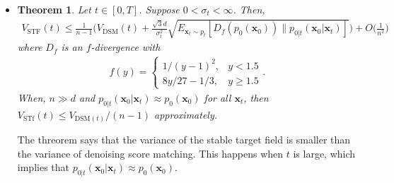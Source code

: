 \documentclass[10pt]{article}
\newtheorem{theorem}[lemma]{Theorem}
\newcommand{\ve}[1]{\mathbf{#1}}
\newcommand{\mrm}[1]{\mathrm{#1}}
\begin{document}
\begin{itemize}
  \item \begin{theorem}
    Let $t \in [0, T]$. Suppose $0 < \sigma_t < \infty$. Then,
    \begin{align*}
      V_{\mrm{STF}}(t) \leq \frac{1}{n-1} \bigg( V_{\mrm{DSM}}(t) + \frac{\sqrt{3}d}{\sigma_t^2} \sqrt{E_{\ve{x}_t \sim p_t}[D_f(p_0(\ve{x}_0)) \| p_{0|t}(\ve{x}_0|\ve{x}_t) ]}  \bigg) + O\bigg( \frac{1}{n^2} \bigg)
    \end{align*}
    where $D_f$ is an $f$-divergence with
    \begin{align*}
      f(y) = \begin{cases}
        1/(y-1)^2, & y < 1.5 \\
        8y/27 - 1/3, & y \geq 1.5
      \end{cases}.
    \end{align*}
    When, $n \gg d$ and $p_{0|t}(\ve{x}_0|\ve{x}_t) \approx p_0(\ve{x}_0)$ for all $\ve{x}_t$, then $V_{\mrm{STf}}(t) \leq V_{\mrm{DSM}(t)}/(n-1)$ approximately.
  \end{theorem}
  The threorem says that the variance of the stable target field is smaller than the variance of denoising score matching. This happens when $t$ is large, which implies that $p_{0|t}(\ve{x}_0|\ve{x}_t) \approx p_0(\ve{x}_0)$.
\end{itemize}


  
\end{document}
